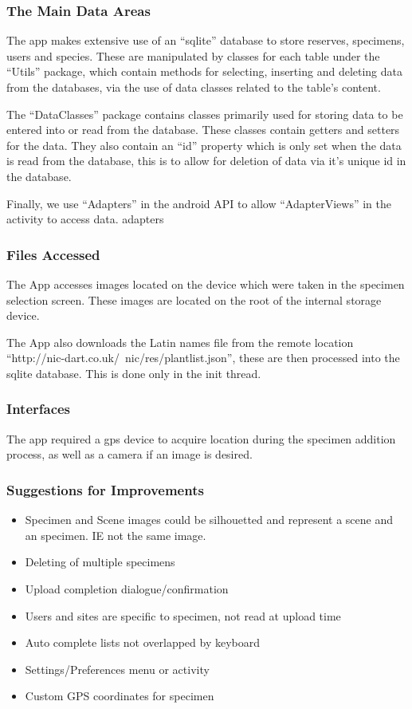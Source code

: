     \subsubsection{The Main Data Areas}
        The app makes extensive use of an ``sqlite'' database to store reserves, specimens, users and species. These are manipulated by classes for each table under the ``Utils'' package, which contain methods for selecting, inserting and deleting data from the databases, via the use of data classes related to the table's content.

        The ``DataClasses'' package contains classes primarily used for storing data to be entered into or read from the database. These classes contain getters and setters for the data. They also contain an ``id'' property which is only set when the data is read from the database, this is to allow for deletion of data via it's unique id in the database.

        Finally, we use ``Adapters'' in the android API to allow ``AdapterViews'' in the activity to access data.
        adapters

    \subsubsection{Files Accessed}
        The App accesses images located on the device which were taken in the specimen selection screen. These images are located on the root of the internal storage device.

        The App also downloads the Latin names file from the remote location ``http://nic-dart.co.uk/~nic/res/plantlist.json'', these are then processed into the sqlite database. This is done only in the init thread.

    \subsubsection{Interfaces}
        The app required a gps device to acquire location during the specimen addition process, as well as a camera if an image is desired.

    \subsubsection{Suggestions for Improvements}
        \begin{itemize}
            \item Specimen and Scene images could be silhouetted and represent a scene and an specimen. IE not the same image.
            \item Deleting of multiple specimens
            \item Upload completion dialogue/confirmation
            \item Users and sites are specific to specimen, not read at upload time
            \item Auto complete lists not overlapped by keyboard
            \item Settings/Preferences menu or activity
            \item Custom GPS coordinates for specimen
        \end{itemize}

